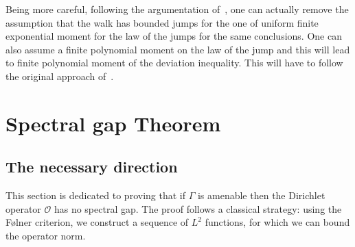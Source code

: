 \documentclass[AHL,Unicode,longabstracts,published]{cedram}
\newcommand{\cO}{\mathcal{O}}
\begin{document}
Being more careful, following the argumentation of~\cite[Proposition~8.2]{artpierremoilargedev}, one can actually remove the assumption that the walk has bounded jumps for the one of uniform finite exponential moment for the law of the jumps for the same conclusions. One can also assume a finite polynomial moment on the law of the jump and this will lead to finite polynomial moment of the deviation inequality. This will have to follow the original approach of~\cite[Section~11]{artmathieusisto}.



\section{Spectral gap Theorem}
\label{sec-proof spectral gap}

\subsection{The necessary direction}\label{subsec-if and only if}
This section is dedicated to proving that if $\Gamma$ is amenable then the Dirichlet operator $\cO$ has no spectral gap. The proof follows a classical strategy: using the F\o lner criterion, we construct a sequence of $L^2$ functions, for which we can bound the operator norm. 
\end{document}
